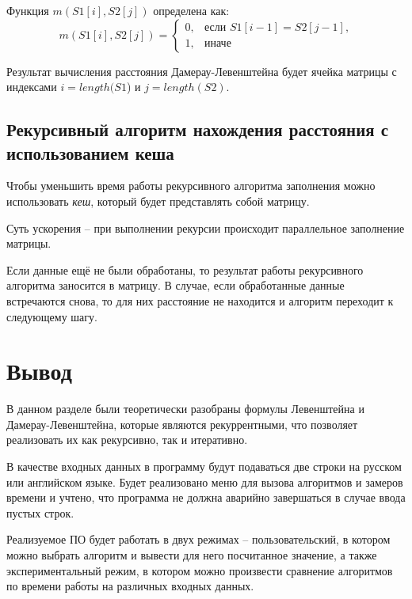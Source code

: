 Функция $m(S1[i], S2[j])$ определена как:
\begin{equation}
\label{eq:m2}
m(S1[i], S2[j]) = \begin{cases}
0, &\text{если $S1[i - 1] = S2[j - 1]$,}\\
1, &\text{иначе}
\end{cases}
\end{equation}

Результат вычисления расстояния Дамерау-Левенштейна будет ячейка матрицы с индексами $i = length(S1$) и $j = length(S2)$.


\subsection{Рекурсивный алгоритм нахождения расстояния с использованием кеша}

Чтобы уменьшить время работы рекурсивного алгоритма заполнения можно использовать \textit{кеш}, который будет представлять собой матрицу.

Суть ускорения -- при выполнении рекурсии происходит параллельное заполнение матрицы.

Если данные ещё не были обработаны, то результат работы рекурсивного алгоритма заносится в матрицу. 
В случае, если обработанные данные встречаются снова, то для них расстояние не находится и алгоритм переходит к следующему шагу.


\section{Вывод}
В данном разделе были теоретически разобраны формулы Левенштейна и Дамерау-Левенштейна, которые являются рекуррентными, что позволяет реализовать их как рекурсивно, так и итеративно.

В качестве входных данных в программу будут подаваться две строки на русском или английском языке. 
Будет реализовано меню для вызова алгоритмов и замеров времени и учтено, что программа не должна аварийно завершаться в случае ввода пустых строк.

Реализуемое ПО будет работать в двух режимах -- пользовательский, в котором можно выбрать алгоритм и вывести для него посчитанное значение, а также экспериментальный режим, в котором можно произвести сравнение алгоритмов по времени работы на различных входных данных.
